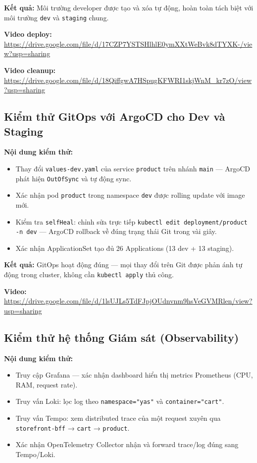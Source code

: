 \textbf{Kết quả:} Môi trường developer được tạo và xóa tự động, hoàn toàn tách biệt với môi trường \texttt{dev} và \texttt{staging} chung.

\noindent\textbf{Video deploy:} \url{https://drive.google.com/file/d/17CZP7YSTSHlhlE0ymXXtWeBvk8dTYXK-/view?usp=sharing}

\noindent\textbf{Video cleanup:} \url{https://drive.google.com/file/d/18QiffgwA7HSpugKFWRI1skjWnM_kr7zO/view?usp=sharing}

\subsection{Kiểm thử GitOps với ArgoCD cho Dev và Staging}

\textbf{Nội dung kiểm thử:}
\begin{itemize}
    \item Thay đổi \texttt{values-dev.yaml} của service \texttt{product} trên nhánh \texttt{main} — ArgoCD phát hiện \texttt{OutOfSync} và tự động sync.
    \item Xác nhận pod \texttt{product} trong namespace \texttt{dev} được rolling update với image mới.
    \item Kiểm tra \texttt{selfHeal}: chỉnh sửa trực tiếp \texttt{kubectl edit deployment/product -n dev} — ArgoCD rollback về đúng trạng thái Git trong vài giây.
    \item Xác nhận ApplicationSet tạo đủ 26 Applications (13 dev + 13 staging).
\end{itemize}

\textbf{Kết quả:} GitOps hoạt động đúng — mọi thay đổi trên Git được phản ánh tự động trong cluster, không cần \texttt{kubectl apply} thủ công.

\noindent\textbf{Video:} \url{https://drive.google.com/file/d/1lsUJLs5TdFJpjOUdnvnm9hsVeGVMRlen/view?usp=sharing}

\subsection{Kiểm thử hệ thống Giám sát (Observability)}

\textbf{Nội dung kiểm thử:}
\begin{itemize}
    \item Truy cập Grafana — xác nhận dashboard hiển thị metrics Prometheus (CPU, RAM, request rate).
    \item Truy vấn Loki: lọc log theo \texttt{namespace="yas"} và \texttt{container="cart"}.
    \item Truy vấn Tempo: xem distributed trace của một request xuyên qua \texttt{storefront-bff} → \texttt{cart} → \texttt{product}.
    \item Xác nhận OpenTelemetry Collector nhận và forward trace/log đúng sang Tempo/Loki.
\end{itemize}

